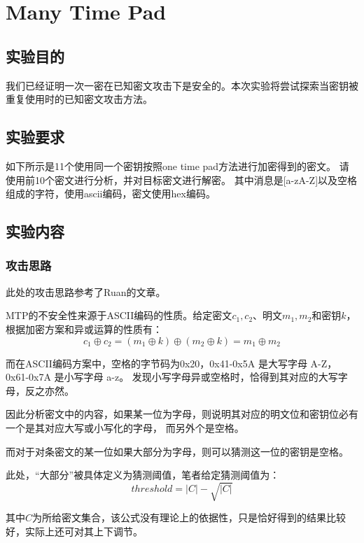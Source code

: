 \chapter{Many Time Pad}

\section{实验目的}

我们已经证明一次一密在已知密文攻击下是安全的。本次实验将尝试探索当密钥被重复使用时的已知密文攻击方法。

\section{实验要求}
如下所示是11个使用同一个密钥按照one time pad方法进行加密得到的密文。
请使用前10个密文进行分析，并对目标密文进行解密。
其中消息是[a-zA-Z]以及空格组成的字符，使用ascii编码，密文使用hex编码。

\section{实验内容}

\subsection{攻击思路}

此处的攻击思路参考了Ruan的文章\cite{ruan_2020}。

MTP的不安全性来源于ASCII编码的性质。给定密文$c_1,c_2$、明文$m_1,m_2$和密钥$k$，
根据加密方案和异或运算的性质有：
\begin{equation}
    c_1 \oplus c_2 = (m_1 \oplus k) \oplus (m_2 \oplus k) = m_1 \oplus m_2
\end{equation}

而在ASCII编码方案中，空格的字节码为0x20，0x41-0x5A 是大写字母 A-Z，0x61-0x7A 是小写字母 a-z。
发现小写字母异或空格时，恰得到其对应的大写字母，反之亦然。

因此分析密文中的内容，如果某一位为字母，则说明其对应的明文位和密钥位必有一个是其对应大写或小写化的字母，
而另外个是空格。

而对于对条密文的某一位如果大部分为字母，则可以猜测这一位的密钥是空格。

此处，“大部分”被具体定义为猜测阈值，笔者给定猜测阈值为：
\begin{equation}
    threshold = |C| - \sqrt{|C|}
\end{equation}

其中$C$为所给密文集合，该公式没有理论上的依据性，只是恰好得到的结果比较好，实际上还可对其上下调节。

